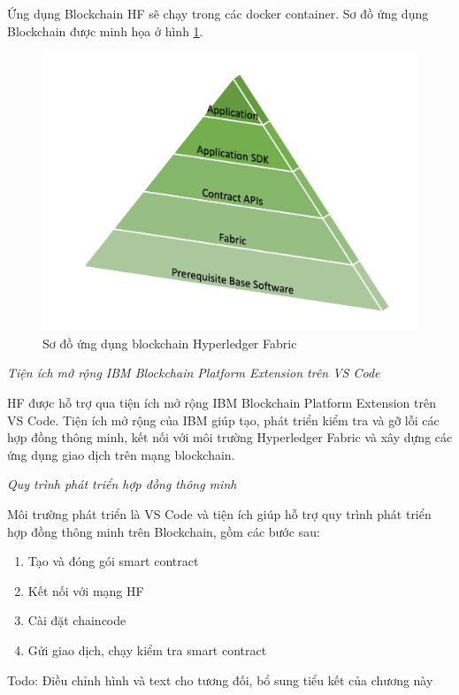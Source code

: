 Ứng dụng Blockchain HF sẽ chạy trong các docker container. Sơ đồ ứng dụng Blockchain được minh họa ở hình \ref{fig:getting_started_image2.png}.

\begin{figure}[htbp]
\centering
\includegraphics[width=.9\linewidth]{img/getting_started_image2.png}
\caption{Sơ đồ ứng dụng blockchain Hyperledger Fabric}
\label{fig:getting_started_image2.png}
\end{figure}

\emph{Tiện ích mở rộng  IBM Blockchain Platform Extension trên VS Code}

HF được hỗ trợ  qua tiện ích mở rộng IBM Blockchain Platform Extension trên VS Code. 
Tiện ích mở rộng của IBM giúp tạo,  phát triển kiểm tra và gỡ lỗi các hợp đồng thông minh, kết nối với môi trường Hyperledger Fabric và xây dựng các ứng dụng giao dịch trên mạng blockchain.

\emph{Quy trình phát triển hợp đồng thông minh}

Môi trường phát triển là VS Code và tiện ích giúp hỗ trợ quy trình phát  triển hợp đồng thông minh trên Blockchain, gồm các bước sau:
\begin{enumerate}
	\item Tạo và đóng gói smart contract
	\item Kết nối với mạng HF
	\item Cài đặt chaincode
	\item Gửi giao dịch, chạy kiểm tra smart contract
\end{enumerate}


Todo: Điều chỉnh hình và text cho tương đối, bổ sung tiểu kết của chương này
